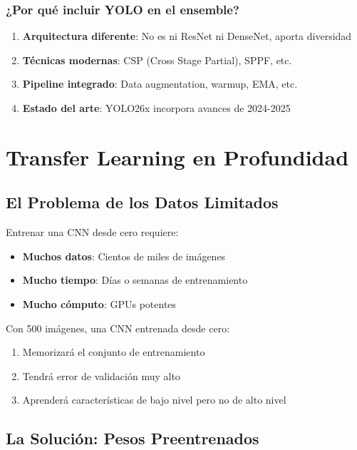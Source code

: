 \documentclass[12pt,a4paper]{article}
\begin{document}
\subsubsection{¿Por qué incluir YOLO en el ensemble?}

\begin{enumerate}
    \item \textbf{Arquitectura diferente}: No es ni ResNet ni DenseNet, aporta diversidad
    \item \textbf{Técnicas modernas}: CSP (Cross Stage Partial), SPPF, etc.
    \item \textbf{Pipeline integrado}: Data augmentation, warmup, EMA, etc.
    \item \textbf{Estado del arte}: YOLO26x incorpora avances de 2024-2025
\end{enumerate}

\section{Transfer Learning en Profundidad}

\subsection{El Problema de los Datos Limitados}

Entrenar una CNN desde cero requiere:
\begin{itemize}
    \item \textbf{Muchos datos}: Cientos de miles de imágenes
    \item \textbf{Mucho tiempo}: Días o semanas de entrenamiento
    \item \textbf{Mucho cómputo}: GPUs potentes
\end{itemize}

Con 500 imágenes, una CNN entrenada desde cero:
\begin{enumerate}
    \item Memorizará el conjunto de entrenamiento
    \item Tendrá error de validación muy alto
    \item Aprenderá características de bajo nivel pero no de alto nivel
\end{enumerate}

\subsection{La Solución: Pesos Preentrenados}
\end{document}
